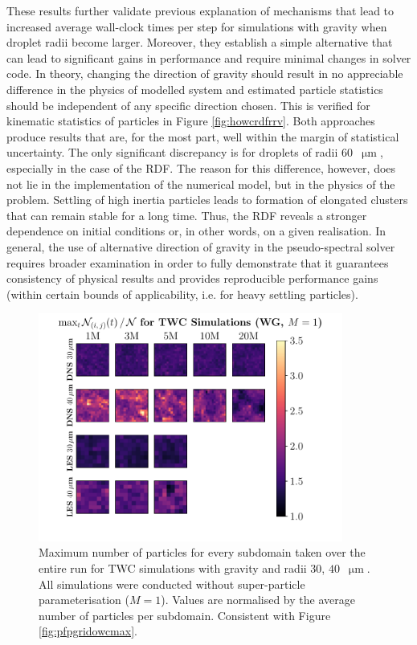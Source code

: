 \documentclass{pracamgren}
\begin{document}
These results further validate previous explanation of mechanisms that lead to increased average wall-clock times per step for simulations with gravity when droplet radii become larger.
Moreover, they establish a simple alternative that can lead to significant gains in performance and require minimal changes in solver code.
In theory, changing the direction of gravity should result in no appreciable difference in the physics of modelled system and estimated particle statistics should be independent of any specific direction chosen.
This is verified for kinematic statistics of particles in Figure \ref{fig:howcrdfrrv}.
Both approaches produce results that are, for the most part, well within the margin of statistical uncertainty.
The only significant discrepancy is for droplets of radii $60$~$\upmu\text{m}$, especially in the case of the RDF.
The reason for this difference, however, does not lie in the implementation of the numerical model, but in the physics of the problem.
Settling of high inertia particles leads to formation of elongated clusters that can remain stable for a long time.
Thus, the RDF reveals a stronger dependence on initial conditions or, in other words, on a given realisation.
In general, the use of alternative direction of gravity in the pseudo-spectral solver requires broader examination in order to fully demonstrate that it guarantees consistency of physical results and provides reproducible performance gains (within certain bounds of applicability, i.e. for heavy settling particles).

\begin{figure}[!ht]
\centering
\includegraphics[width=10cm]{figures/3-23_pfpgridtwcmax.pdf}
\caption{
Maximum number of particles for every subdomain taken over the entire run for TWC simulations with gravity and radii $30$, $40$~$\upmu\text{m}$.
All simulations were conducted without super-particle parameterisation ($M=1$). 
Values are normalised by the average number of particles per subdomain.
Consistent with Figure \ref{fig:pfpgridowcmax}.
}
\label{fig:pfpgridtwcmax}
\end{figure}
\end{document}
